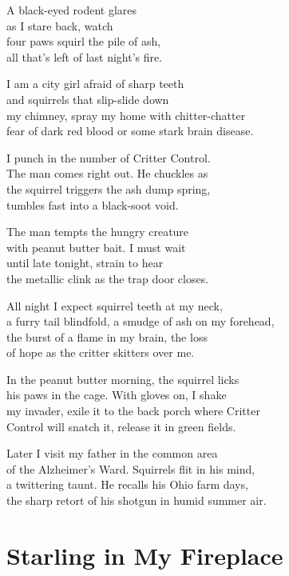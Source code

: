 \documentclass[twoside,10pt]{book}
\begin{document}
A black-eyed rodent glares\\
as I stare back, watch\\
four paws squirl the pile of ash,\\
all that's left of last night's fire.

I am a city girl afraid of sharp teeth\\
and squirrels that slip-slide down\\
my chimney, spray my home with chitter-chatter\\
fear of dark red blood or some stark brain disease.

I punch in the number of Critter Control.\\
The man comes right out. He chuckles as\\
the squirrel triggers the ash dump spring,\\
tumbles fast into a black-soot void.

The man tempts the hungry creature\\
with peanut butter bait. I must wait\\
until late tonight, strain to hear\\
the metallic clink as the trap door closes.

All night I expect squirrel teeth at my neck,\\
a furry tail blindfold, a smudge of ash on my forehead,\\
the burst of a flame in my brain, the loss\\
of hope as the critter skitters over me.

In the peanut butter morning, the squirrel licks\\
his paws in the cage. With gloves on, I shake\\
my invader, exile it to the back porch where Critter\\
Control will snatch it, release it in green fields.

Later I visit my father in the common area\\
of the Alzheimer's Ward. Squirrels flit in his mind,\\
a twittering taunt. He recalls his Ohio farm days,\\
the sharp retort of his shotgun in humid summer air.


\clearpage
\section{Starling in My Fireplace}
\end{document}
